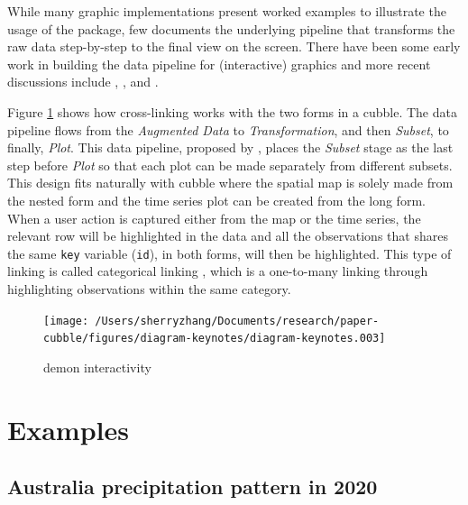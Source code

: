 \documentclass[
]{jss}
\begin{document}
While many graphic implementations present worked examples to illustrate
the usage of the package, few documents the underlying pipeline that
transforms the raw data step-by-step to the final view on the screen.
There have been some early work in building the data pipeline for
(interactive) graphics
\citep{buja1988elements, buja1996interactive, sutherland2000orca} and
more recent discussions include \citet{wickham2009plumbing},
\citet{xie2014reactive}, and \citet{cheng2016enabling}.

Figure \ref{fig:interactive-workflow} shows how cross-linking works with
the two forms in a cubble. The data pipeline flows from the
\emph{Augmented Data} to \emph{Transformation}, and then \emph{Subset},
to finally, \emph{Plot}. This data pipeline, proposed by
\citet{wickham2009plumbing}, places the \emph{Subset} stage as the last
step before \emph{Plot} so that each plot can be made separately from
different subsets. This design fits naturally with cubble where the
spatial map is solely made from the nested form and the time series plot
can be created from the long form. When a user action is captured either
from the map or the time series, the relevant row will be highlighted in
the data and all the observations that shares the same \texttt{key}
variable (\texttt{id}), in both forms, will then be highlighted. This
type of linking is called categorical linking \citep{xie2014reactive},
which is a one-to-many linking through highlighting observations within
the same category.

\begin{CodeChunk}
\begin{figure}

{\centering \texttt{[image: /Users/sherryzhang/Documents/research/paper-cubble/figures/diagram-keynotes/diagram-keynotes.003]} 

}

\caption[demon interactivity]{demon interactivity}\label{fig:interactive-workflow}
\end{figure}
\end{CodeChunk}

\newpage

\hypertarget{examples}{%
\section{Examples}\label{examples}}

\hypertarget{australia-precipitation-pattern-in-2020}{%
\subsection{Australia precipitation pattern in
2020}\label{australia-precipitation-pattern-in-2020}}
\end{document}
